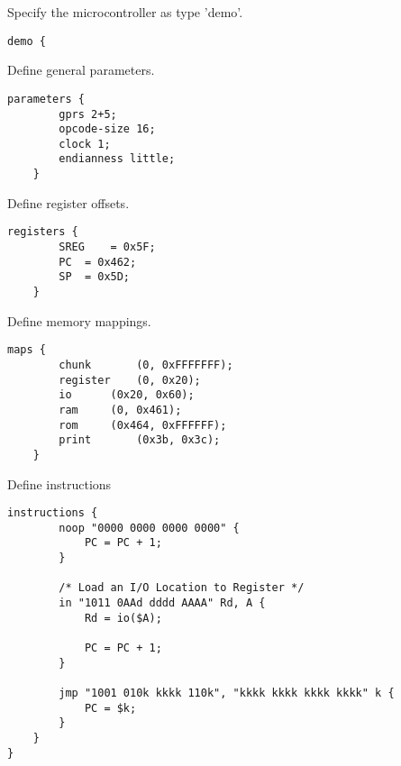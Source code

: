 \begin{block}{\large {}\vphantom{Example Code}}

\tiny {  

Specify the microcontroller as type 'demo'.
\begin{lstlisting}
demo {
\end{lstlisting}

Define general parameters.
\begin{lstlisting}[name=demo.dmo]
	parameters {
		gprs 2+5;
		opcode-size 16;
		clock 1;
		endianness little;
	}
\end{lstlisting}

Define register offsets.
\begin{lstlisting}[name=demo.dmo]
	registers {
		SREG	= 0x5F;
		PC	= 0x462;
		SP	= 0x5D;
	}
\end{lstlisting}

Define memory mappings.
\begin{lstlisting}[name=demo.dmo]
	maps {
		chunk		(0, 0xFFFFFFF);
		register	(0, 0x20);
		io		(0x20, 0x60);
		ram		(0, 0x461);
		rom		(0x464, 0xFFFFFF);
		print		(0x3b, 0x3c);
	}

\end{lstlisting}

Define instructions
\begin{lstlisting}[name=demo.dmo]
	instructions {
		noop "0000 0000 0000 0000" {
			PC = PC + 1;
		}

		/* Load an I/O Location to Register */
		in "1011 0AAd dddd AAAA" Rd, A {
			Rd = io($A);

			PC = PC + 1;
		}

		jmp "1001 010k kkkk 110k", "kkkk kkkk kkkk kkkk" k {
			PC = $k;
		}
	}
}  
\end{lstlisting}

}

\end{block}
